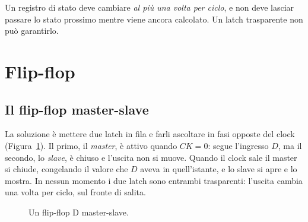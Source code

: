 \begin{prgconcept}
Un registro di stato deve cambiare \emph{al più una volta per ciclo}, e non
deve lasciar passare lo stato prossimo mentre viene ancora calcolato. Un latch
trasparente non può garantirlo.
\end{prgconcept}

\section{Flip-flop}

\subsection{Il flip-flop master-slave}

La soluzione è mettere due latch in fila e farli ascoltare in fasi opposte del
clock (Figura~\ref{fig:seq:ms}). Il primo, il \emph{master}, è attivo quando
$CK=0$: segue l'ingresso $D$, ma il secondo, lo \emph{slave}, è chiuso e
l'uscita non si muove. Quando il clock sale il master si chiude, congelando il
valore che $D$ aveva in quell'istante, e lo slave si apre e lo mostra. In
nessun momento i due latch sono entrambi trasparenti: l'uscita cambia una volta
per ciclo, sul fronte di salita.

\begin{figure}[htb]
\centering
{}
\caption{Un flip-flop D master-slave.}
\label{fig:seq:ms}
\end{figure}

